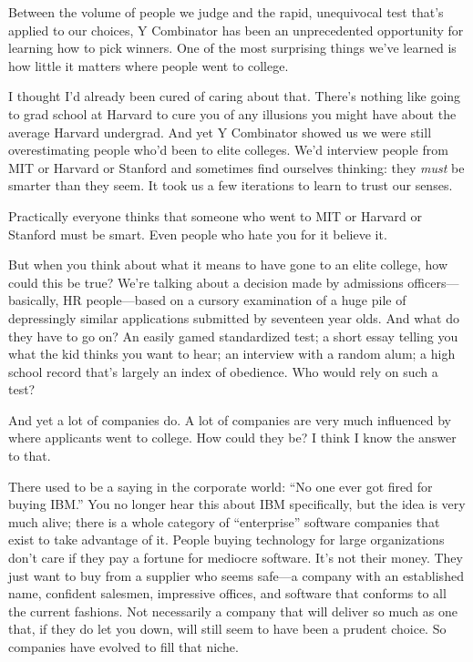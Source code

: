 Between the volume of people we judge and the rapid, unequivocal test
that's applied to our choices, Y Combinator has been an unprecedented
opportunity for learning how to pick winners. One of the most surprising
things we've learned is how little it matters where people went to
college.

I thought I'd already been cured of caring about that. There's nothing
like going to grad school at Harvard to cure you of any illusions you
might have about the average Harvard undergrad. And yet Y Combinator
showed us we were still overestimating people who'd been to elite
colleges. We'd interview people from MIT or Harvard or Stanford and
sometimes find ourselves thinking: they \emph{must} be smarter than they
seem. It took us a few iterations to learn to trust our senses.

Practically everyone thinks that someone who went to MIT or Harvard or
Stanford must be smart. Even people who hate you for it believe it.

But when you think about what it means to have gone to an elite college,
how could this be true? We're talking about a decision made by
admissions officers---basically, HR people---based on a cursory
examination of a huge pile of depressingly similar applications
submitted by seventeen year olds. And what do they have to go on? An
easily gamed standardized test; a short essay telling you what the kid
thinks you want to hear; an interview with a random alum; a high school
record that's largely an index of obedience. Who would rely on such a
test?

And yet a lot of companies do. A lot of companies are very much
influenced by where applicants went to college. How could they be? I
think I know the answer to that.

There used to be a saying in the corporate world: ``No one ever got
fired for buying IBM.'' You no longer hear this about IBM specifically,
but the idea is very much alive; there is a whole category of
``enterprise'' software companies that exist to take advantage of it.
People buying technology for large organizations don't care if they pay
a fortune for mediocre software. It's not their money. They just want to
buy from a supplier who seems safe---a company with an established name,
confident salesmen, impressive offices, and software that conforms to
all the current fashions. Not necessarily a company that will deliver so
much as one that, if they do let you down, will still seem to have been
a prudent choice. So companies have evolved to fill that niche.

